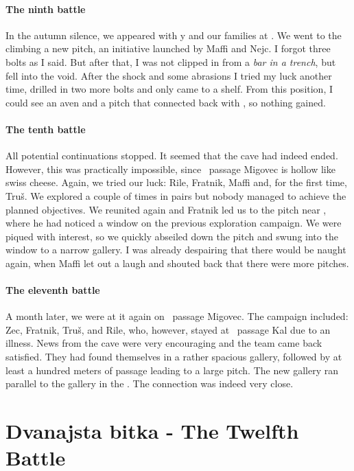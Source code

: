 \paragraph{The ninth battle} In the autumn silence, we appeared with y and our families at . We went to the  climbing a new pitch, an initiative launched by Maffi and Nejc. I forgot three bolts as I said. But after that, I was not clipped in from a \textit{bar in a trench}, but fell into the void. After the shock and some abrasions I tried my luck another time, drilled in two more bolts and only came to a shelf. From this position, I could see an aven and a pitch that connected back with , so nothing gained.

\paragraph{The tenth battle} 
All potential continuations stopped. It seemed that the cave had indeed ended. However, this was practically impossible, since \ passage {Migovec} is hollow like swiss cheese. Again, we tried our luck: Rile, Fratnik, Maffi and, for the first time, Tru\v{s}.  We explored a couple of times in pairs but nobody managed to achieve the planned objectives. We reunited again and Fratnik led us to the pitch near , where he had noticed a window on the previous exploration campaign. We were  piqued with interest, so we quickly abseiled down the pitch and swung into the window to a narrow gallery. I was already despairing that there would be naught again, when Maffi let out a laugh and shouted back that there were more pitches.

\paragraph{The eleventh battle} 
 A month later, we were at it again on \ passage {Migovec}. The campaign included: Zec, Fratnik, Truš,  and Rile, who, however, stayed at \ passage {Kal} due to an illness. News from the cave were very encouraging and the team came back satisfied. They had found themselves in a rather spacious gallery, followed by at least a hundred meters of passage leading to a large pitch. The new gallery ran parallel to the  gallery in the . The connection was indeed very close.

\section{Dvanajsta bitka - The Twelfth Battle}

